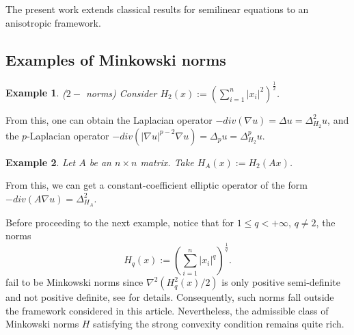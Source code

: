 \documentclass[11pt]{amsart}
\newtheorem{example}{Example}[section]
\newcommand{\D}{\nabla}
\numberwithin{equation}{section}
\begin{document}
The present work extends classical results for semilinear equations to an anisotropic framework.

\subsection{Examples of Minkowski norms}
\begin{example}($2-$ norms)
    Consider
$H_{2}(x):=\left(\displaystyle\sum_{i=1}^{n}|x_{i}|^{2}\right)^{\frac{1}{2}}$.
\end{example}
\vspace{-4mm}
From this, one can obtain the Laplacian operator
       $ -div\left(\D u\right)=\Delta u=\Delta_{H_{2}}^{2}u$, and the $p$-Laplacian operator
    $-div\left(|\D u|^{p-2}\D u\right)=\Delta_{p}u=\Delta_{H_{2}}^{p}u$.
     \begin{example}
      Let $A$ be an $n\times n$ matrix. Take
      $H_{A}(x):=H_{2}(Ax)$.
  \end{example}
  From this, we can get a constant-coefficient elliptic operator of the form $- div\left(A\D u\right)=\Delta_{H_{A}}^{2}$.
  
   Before proceeding to the next example, notice that for $1\leq q<+\infty$, $q\neq 2$, the norms
    \begin{equation*}
H_{q}\left(x\right):=\left(\displaystyle\sum_{i=1}^{n}|x_{i}|^{q}\right)^{\frac{1}{q}}.
   \end{equation*} 
   fail to be Minkowski norms since $\nabla^{2}(H_{q}^{2}(x)/2)$ is only positive semi-definite and not positive definite, see \cite{BaoChernShen2000,Shenbook2001} for details. Consequently, such norms fall outside the framework considered in this article. Nevertheless, the admissible class of Minkowski norms $H$ satisfying the strong convexity condition remains quite rich.
  
\end{document}
